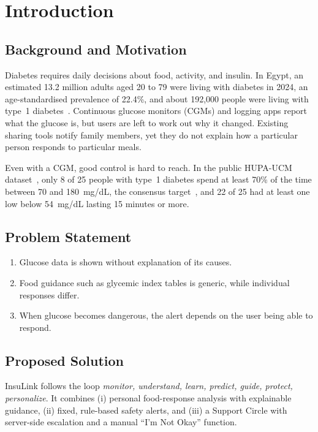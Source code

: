 \chapter{Introduction}

\section{Background and Motivation}
Diabetes requires daily decisions about food, activity, and insulin. In Egypt, an estimated 13.2 million adults aged 20 to 79 were living with diabetes in 2024, an age-standardised prevalence of 22.4\%, and about 192{,}000 people were living with type~1 diabetes~\cite{idf2025}. Continuous glucose monitors (CGMs) and logging apps report what the glucose is, but users are left to work out why it changed. Existing sharing tools notify family members, yet they do not explain how a particular person responds to particular meals.

Even with a CGM, good control is hard to reach. In the public HUPA-UCM dataset~\cite{hupa2024}, only 8 of 25 people with type~1 diabetes spend at least 70\% of the time between 70 and 180~mg/dL, the consensus target~\cite{battelino2019}, and 22 of 25 had at least one low below 54~mg/dL lasting 15 minutes or more.

\section{Problem Statement}
\begin{enumerate}
  \item Glucose data is shown without explanation of its causes.
  \item Food guidance such as glycemic index tables is generic, while individual responses differ.
  \item When glucose becomes dangerous, the alert depends on the user being able to respond.
\end{enumerate}

\section{Proposed Solution}
InsuLink follows the loop \emph{monitor, understand, learn, predict, guide, protect, personalize}. It combines (i) personal food-response analysis with explainable guidance, (ii) fixed, rule-based safety alerts, and (iii) a Support Circle with server-side escalation and a manual ``I'm Not Okay'' function.

